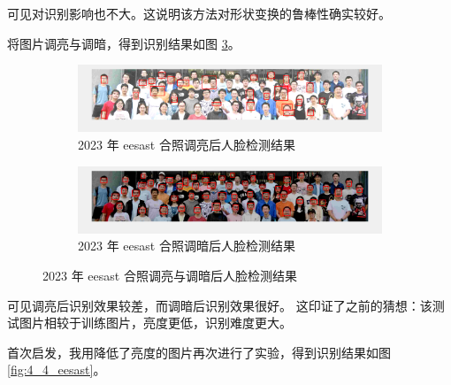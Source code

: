 \documentclass[a4paper]{article}  %
\begin{document}
可见对识别影响也不大。这说明该方法对形状变换的鲁棒性确实较好。

将图片调亮与调暗，得到识别结果如图 \ref{fig:4_3_eesast_4_L3}。

\begin{figure}[ht]
    \centering
    \begin{subfigure}[b]{1.0\textwidth}
        \centering
        \includegraphics[width=\textwidth]{asserts/4_3_eesast_4_L3.png}
        \caption{
            2023 年 eesast 合照调亮后人脸检测结果
        }\label{fig:4_3_eesast_4_L3_1}
    \end{subfigure}
    \vfill
    \begin{subfigure}[b]{1.0\textwidth}
        \centering
        \includegraphics[width=\textwidth]{asserts/4_3_eesast_5_L3.png}
        \caption{
            2023 年 eesast 合照调暗后人脸检测结果
        }\label{fig:4_3_eesast_4_L3_2}
    \end{subfigure}
    \caption{
        2023 年 eesast 合照调亮与调暗后人脸检测结果
    }\label{fig:4_3_eesast_4_L3}
\end{figure}

可见调亮后识别效果较差，而调暗后识别效果很好。
这印证了之前的猜想：该测试图片相较于训练图片，亮度更低，识别难度更大。

首次启发，我用降低了亮度的图片再次进行了实验，得到识别结果如图 \ref{fig:4_4_eesast}。
\end{document}

